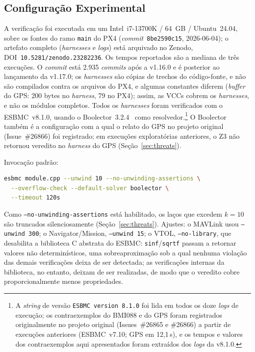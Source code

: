 \documentclass[conference]{IEEEtran}
\begin{document}
\subsection{Configuração Experimental}
\label{subsec:setup}

A verificação foi executada em um Intel~i7-13700K / 64~GB /
Ubuntu~24.04, sobre os fontes do ramo \texttt{main} do PX4
(\textit{commit}~\texttt{8be2590c15}, 2026-06-04); o artefato
completo (\textit{harnesses} e \textit{logs}) está arquivado no
Zenodo, DOI~\texttt{10.5281/zenodo.23282236}. Os tempos reportados
são a mediana de três execuções. O \textit{commit} está 2.935
\textit{commits} após a v1.16.0 e é posterior ao lançamento da
v1.17.0; os \textit{harnesses} são cópias de trechos do código-fonte,
e não são compilados contra os arquivos do PX4, e algumas constantes
diferem (\textit{buffer} do GPS: 200 bytes no \textit{harness}, 79 no
PX4); assim, as VCCs cobrem os \textit{harnesses}, e não os módulos
completos. Todos os \textit{harnesses} foram verificados com o
ESBMC~v8.1.0, usando o Boolector~3.2.4~\cite{Brummayer2009} como
resolvedor.\footnote{A \textit{string} de versão
\texttt{ESBMC version 8.1.0} foi lida em todos os doze \textit{logs}
de execução; os contraexemplos do BMI088 e do GPS foram registrados
originalmente no projeto original (Issues~\#26865 e \#26866) a partir
de execuções anteriores (ESBMC~v7.10; GPS em 12,1\,s), e os tempos e
valores dos contraexemplos aqui apresentados foram extraídos dos
\textit{logs} da v8.1.0.} O Boolector também é a configuração com a
qual o relato do GPS no projeto original (Issue~\#26866) foi
registrado; em execuções exploratórias anteriores, o Z3 não retornou
veredito no \textit{harness} do GPS (Seção~\ref{sec:threats}).

\noindent\begin{minipage}{\columnwidth}
Invocação padrão:
\begin{lstlisting}[language=bash,breaklines=true]
esbmc module.cpp --unwind 10 --no-unwinding-assertions \
  --overflow-check --default-solver boolector \
  --timeout 120s
\end{lstlisting}
\end{minipage}
Como \texttt{--no-unwinding-assertions} está habilitado, os laços que
excedem $k=10$ são truncados silenciosamente
(Seção~\ref{sec:threats}).
Ajustes: o MAVLink usou \texttt{--unwind~300}; o Navigator/Mission,
\texttt{--unwind~15}; o VTOL, \texttt{--no-library}, que desabilita a
biblioteca C abstrata do ESBMC: \texttt{sinf}/\texttt{sqrtf} passam a
retornar valores não determinísticos, uma sobreaproximação sob a qual
nenhuma violação das demais verificações deixa de ser detectada; as
verificações internas da biblioteca, no entanto, deixam de ser
realizadas, de modo que o veredito cobre proporcionalmente menos
propriedades.
\end{document}
